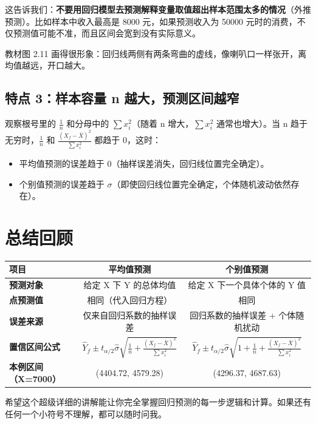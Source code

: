 \documentclass[12pt,a4paper]{article}
\begin{document}
这告诉我们：\textbf{不要用回归模型去预测解释变量取值超出样本范围太多的情况}（外推预测）。比如样本中收入最高是 8000 元，如果预测收入为 50000 元时的消费，不仅预测值可能不准，而且区间会宽到没有实际意义。

教材图 2.11 画得很形象：回归线两侧有两条弯曲的虚线，像喇叭口一样张开，离均值越远，开口越大。

\subsection*{特点 3：样本容量 n 越大，预测区间越窄}
观察根号里的 \(\frac{1}{n}\) 和分母中的 \(\sum x_i^2\)（随着 n 增大，\(\sum x_i^2\) 通常也增大）。当 n 趋于无穷时，\(\frac{1}{n}\) 和 \(\frac{(X_f - \bar{X})^2}{\sum x_i^2}\) 都趋于 0，这时：
\begin{itemize}
\item 平均值预测的误差趋于 0（抽样误差消失，回归线位置完全确定）。
\item 个别值预测的误差趋于 \(\sigma\)（即使回归线位置完全确定，个体随机波动依然存在）。
\end{itemize}

\section*{总结回顾}

\begin{center}
\begin{tabular}{|l|c|c|}
\hline
\textbf{项目} & \textbf{平均值预测} & \textbf{个别值预测} \\
\hline
\textbf{预测对象} & 给定 X 下 Y 的总体均值 & 给定 X 下一个具体个体的 Y 值 \\
\hline
\textbf{点预测值} & 相同（代入回归方程） & 相同 \\
\hline
\textbf{误差来源} & 仅来自回归系数的抽样误差 & 回归系数的抽样误差 + 个体随机扰动 \\
\hline
\textbf{置信区间公式} & \(\hat{Y}_f \pm t_{\alpha/2} \hat{\sigma} \sqrt{\frac{1}{n} + \frac{(X_f - \bar{X})^2}{\sum x_i^2}}\) & \(\hat{Y}_f \pm t_{\alpha/2} \hat{\sigma} \sqrt{1 + \frac{1}{n} + \frac{(X_f - \bar{X})^2}{\sum x_i^2}}\) \\
\hline
\textbf{本例区间（X=7000）} & (4404.72, 4579.28) & (4296.37, 4687.63) \\
\hline
\end{tabular}
\end{center}

希望这个超级详细的讲解能让你完全掌握回归预测的每一步逻辑和计算。如果还有任何一个小符号不理解，都可以随时问我。
\end{document}
